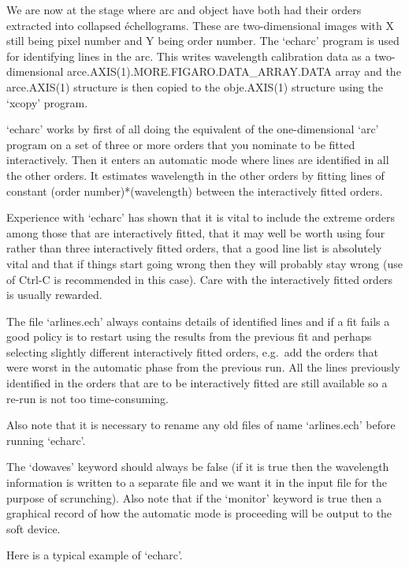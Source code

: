    We are now at the stage where arc and object have both had their
   orders extracted into collapsed \'echellograms. These are
   two-dimensional images with X still being pixel number and Y being
   order number. The `echarc' program is used for identifying lines in
   the arc. This writes wavelength calibration data as a two-dimensional
   arce.\-AXIS(1).\-MORE.\-FIGARO.\-DATA\_\-ARRAY.\-DATA array and the
   arce.AXIS(1) structure is then copied to the obje.AXIS(1) structure
   using the `xcopy' program.

   `echarc' works by first of all doing the equivalent of the
   one-dimensional `arc' program on a set of three or more orders that
   you nominate to be fitted interactively. Then it enters an automatic
   mode where lines are identified in all the other orders. It estimates
   wavelength in the other orders by fitting lines of constant
   (order number)*(wavelength) between the interactively fitted orders.

   Experience with `echarc' has shown that it is vital to include the
   extreme orders among those that are interactively fitted, that it may
   well be worth using four rather than three interactively fitted
   orders, that a good line list is absolutely vital and that if things
   start going wrong then they will probably stay wrong (use of Ctrl-C
   is recommended in this case). Care with the interactively fitted
   orders is usually rewarded.

   The file `arlines.ech' always contains details of identified lines
   and if a fit fails a good policy is to restart using the results from
   the previous fit and perhaps selecting slightly different
   interactively fitted orders, e.g.\ add the orders that were worst in
   the automatic phase from the previous run. All the lines previously
   identified in the orders that are to be interactively fitted are
   still available so a re-run is not too time-consuming.

   Also note that it is necessary to rename any old files of name
   `arlines.ech' before running `echarc'.

   The `dowaves' keyword should always be false (if it is true then the
   wavelength information is written to a separate file and we want it
   in the input file for the purpose of scrunching). Also note that if
   the `monitor' keyword is true then a graphical record of how the
   automatic mode is proceeding will be output to the soft device.

   Here is a typical example of `echarc'.

